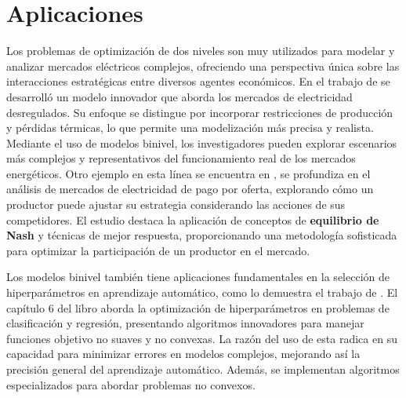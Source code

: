 \section{Aplicaciones}
Los problemas de optimización de dos niveles son muy utilizados para modelar y analizar mercados eléctricos complejos, ofreciendo una perspectiva única sobre las interacciones estratégicas entre diversos agentes económicos.
En el trabajo de  \cite{Aussel2016DeregulatedEM} se desarrolló un modelo innovador que aborda los mercados de electricidad desregulados. Su enfoque se distingue por incorporar restricciones de producción y pérdidas térmicas, lo que permite una modelización más precisa y realista. Mediante el uso de modelos binivel, los investigadores pueden explorar escenarios más complejos y representativos del funcionamiento real de los mercados energéticos.
Otro ejemplo en esta línea se encuentra en \cite{Aussel2017NashEI}, se profundiza en el análisis de mercados de electricidad de pago por oferta, explorando cómo un productor puede ajustar su estrategia considerando las acciones de sus competidores. El estudio destaca la aplicación de conceptos de \textbf{equilibrio de Nash} y técnicas de mejor respuesta, proporcionando una metodología sofisticada para optimizar la participación de un productor en el mercado.


Los modelos binivel también tiene aplicaciones fundamentales en la selección de hiperparámetros en aprendizaje automático, como lo demuestra el trabajo de \cite{DempeyZemkoho2020ML}. El capítulo 6 del libro aborda la optimización de hiperparámetros en problemas de clasificación y regresión, presentando algoritmos innovadores para manejar funciones objetivo no suaves y no convexas. La razón del uso de esta radica en su capacidad para minimizar errores en modelos complejos, mejorando así la precisión general del aprendizaje automático. Además, se implementan algoritmos especializados para abordar problemas no convexos.

